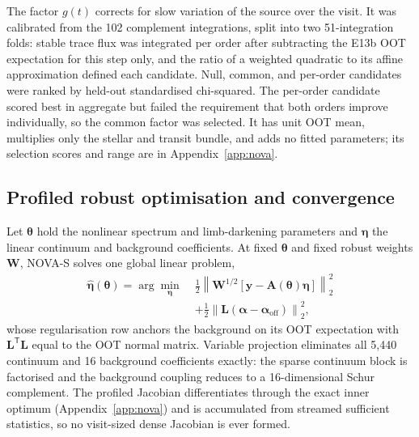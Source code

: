 
The factor $g(t)$ corrects for slow variation of the source over the
visit. It was calibrated from the 102 complement integrations, split into
two 51-integration folds: stable trace flux was integrated per order after
subtracting the E13b OOT expectation for this step only, and the ratio of
a weighted quadratic to its affine approximation defined each candidate.
Null, common, and per-order candidates were ranked by held-out
standardised chi-squared. The per-order candidate scored best in aggregate
but failed the requirement that both orders improve individually, so the
common factor was selected. It has unit OOT mean, multiplies only the
stellar and transit bundle, and adds no fitted parameters; its selection
scores and range are in Appendix~\ref{app:nova}.

\subsection{Profiled robust optimisation and convergence}


Let $\bm{\theta}$ hold the nonlinear spectrum and limb-darkening
parameters and $\bm{\eta}$ the linear continuum and background
coefficients. At fixed $\bm{\theta}$ and fixed robust weights $\bm{W}$,
NOVA-S solves one global linear problem,
\begin{equation}
\begin{split}
 \widehat{\bm{\eta}}(\bm{\theta})=
 \arg\min_{\bm{\eta}}\;
 &\frac{1}{2}\left\|\bm{W}^{1/2}
 [\bm{y}-\bm{A}(\bm{\theta})\bm{\eta}]\right\|_2^2 \\
 &+\frac{1}{2}
 \left\|\bm{L}(\bm{\alpha}-\bm{\alpha}_{\mathrm{off}})\right\|_2^2 ,
\end{split}
 \label{eq:varpro}
\end{equation}
whose regularisation row anchors the background on its OOT expectation
with $\bm{L}^{\mathsf T}\bm{L}$ equal to the OOT normal matrix. Variable
projection \citep{GolubPereyra1973} eliminates all 5{,}440 continuum and
16 background coefficients exactly: the sparse continuum block is
factorised and the background coupling reduces to a 16-dimensional Schur
complement. The profiled Jacobian differentiates through the exact inner
optimum (Appendix~\ref{app:nova}) and is accumulated from streamed
sufficient statistics, so no visit-sized dense Jacobian is ever formed.

